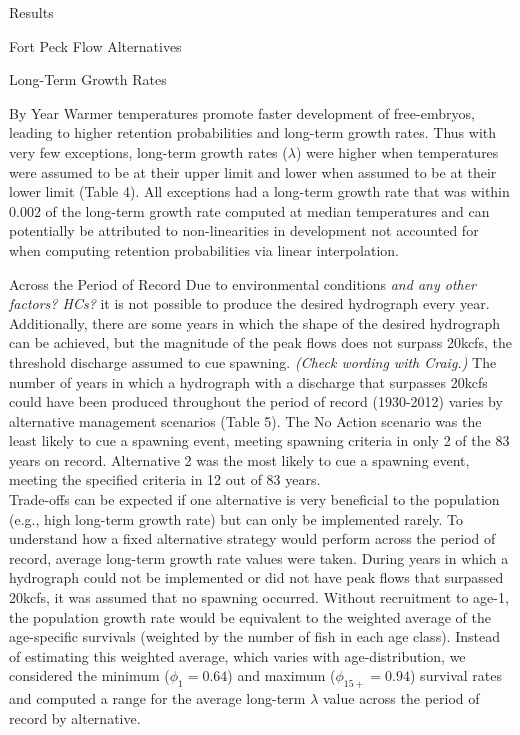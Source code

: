 \documentclass[12pt]{article}
\begin{document}
\begin{section}{Results}
\begin{subsection}{Fort Peck Flow Alternatives}
\begin{subsubsection}{Long-Term Growth Rates}
\begin{paragraph}{By Year}
Warmer temperatures promote faster development of free-embryos, leading to higher retention probabilities and long-term growth rates.  Thus with very few exceptions, long-term growth rates ($\lambda$) were higher when temperatures were assumed to be at their upper limit and lower when assumed to be at their lower limit (Table 4).  All exceptions had a long-term growth rate that was within 0.002 of the long-term growth rate computed at median temperatures and can potentially be attributed to non-linearities in development not accounted for when computing retention probabilities via linear interpolation.   
\end{paragraph}
\begin{paragraph}{Across the Period of Record}
Due to environmental conditions \textit{and any other factors? HCs?} it is not possible to produce the desired hydrograph every year.  Additionally, there are some years in which the shape of the desired hydrograph can be achieved, but the magnitude of the peak flows does not surpass 20kcfs, the threshold discharge assumed to cue spawning. \textit{(Check wording with Craig.)}  The number of years in which a hydrograph with a discharge that surpasses 20kcfs could have been produced throughout the period of record (1930-2012) varies by alternative management scenarios (Table 5).  The No Action scenario was the least likely to cue a spawning event, meeting spawning criteria in only 2 of the 83 years on record.  Alternative 2 was the most likely to cue a spawning event, meeting the specified criteria in 12 out of 83 years.\\   

Trade-offs can be expected if one alternative is very beneficial to the population (e.g., high long-term growth rate) but can only be implemented rarely.  To understand how a fixed alternative strategy would perform across the period of record, average long-term growth rate values were taken.  During years in which a hydrograph could not be implemented or did not have peak flows that surpassed 20kcfs, it was assumed that no spawning occurred.  Without recruitment to age-1, the population growth rate would be equivalent to the weighted average of the age-specific survivals (weighted by the number of fish in each age class).  Instead of estimating this weighted average, which varies with age-distribution, we considered the minimum ($\phi_1=0.64$) and maximum ($\phi_{15+}=0.94$) survival rates  and computed a range for the average long-term $\lambda$ value across the period of record by alternative.\\


\end{paragraph}
\end{subsubsection}
\end{subsection}
\end{section}
\end{document}
